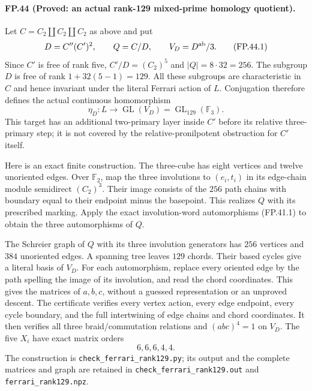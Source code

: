\paragraph{FP.44 (Proved: an actual rank-129 mixed-prime homology quotient).}
Let $C=C_2\amalg C_2\amalg C_2$ as above and put
\[
 D=C''(C')^2,\qquad Q=C/D,
 \qquad V_D=D^{\rm ab}/3.
 \tag{FP.44.1}
\]
Since $C'$ is free of rank five, $C'/D=(C_2)^5$ and
$|Q|=8\cdot32=256$. The subgroup $D$ is free of rank
$1+32(5-1)=129$. All these subgroups are characteristic
in $C$ and hence invariant under the literal Ferrari action
of $L$. Conjugation therefore defines the actual continuous
homomorphism
\[
           \eta_D:L\longrightarrow
                    \operatorname{GL}(V_D)
                    =\operatorname{GL}_{129}(\mathbb F_3).
 \tag{FP.44.2}
\]
This target has an additional two-primary layer inside $C'$
before its relative three-primary step; it is not covered by
the relative-pronilpotent obstruction for $C'$ itself.

Here is an exact finite construction. The three-cube has
eight vertices and twelve unoriented edges. Over $\mathbb F_2$,
map the three involutions to $(e_i,t_i)$ in its edge-chain
module semidirect $(C_2)^3$. Their image consists of the
$256$ path chains with boundary equal to their endpoint minus
the basepoint. This realizes $Q$ with its prescribed marking.
Apply the exact involution-word automorphisms (FP.41.1) to
obtain the three automorphisms of $Q$.

The Schreier graph of $Q$ with its three involution generators
has $256$ vertices and $384$ unoriented edges. A spanning
tree leaves $129$ chords. Their based cycles give a literal
basis of $V_D$. For each automorphism, replace every oriented
edge by the path spelling the image of its involution, and
read the chord coordinates. This gives the matrices of
$a,b,c$, without a guessed representation or an unproved
descent. The certificate verifies every vertex action, every
edge endpoint, every cycle boundary, and the full intertwining
of edge chains and chord coordinates. It then verifies all
three braid/commutation relations and $(abc)^4=1$ on
$V_D$. The five $X_i$ have exact matrix orders
\[
                         6,6,6,4,4.
 \tag{FP.44.3}
\]
The construction is \texttt{check\_ferrari\_rank129.py}; its
output and the complete matrices and graph are retained in
\texttt{check\_ferrari\_rank129.out} and
\texttt{ferrari\_rank129.npz}.

